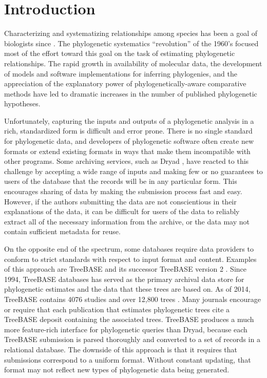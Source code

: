 \section{Introduction}

Characterizing and systematizing relationships among species has been a goal of biologists since \cite{Linne1758}.
The phylogenetic systematics ``revolution'' of the 1960's focused most of the effort toward this goal on the 
    task of estimating phylogenetic relationships.
The rapid growth in availability of molecular data, the development of models and software implementations for
    inferring phylogenies, and the appreciation of the explanatory power of phylogenetically-aware comparative methods
    \citep[e.g.][]{Felsenstein1985Comp} have led to dramatic increases
    in the number of published phylogenetic hypotheses.

Unfortunately, capturing the inputs and outputs of a phylogenetic analysis in a rich, standardized form is
 difficult and error prone. There is no single standard for phylogenetic data, and developers of phylogenetic software often create new formats or extend existing formats in ways that make them incompatible with other programs.
Some archiving services, such as Dryad \citep{Dryad}, have reacted to this challenge by accepting a 
    wide range of inputs and making few or no
    guarantees to users of the database that the records will be in any particular form.
This encourages sharing of data by making the submission process fast and easy. %
However, if the authors submitting the data are not conscientious in their explanations of the data, it can be difficult
    for users of the data to reliably extract all of the necessary information from the archive, or the data may not contain sufficient metadata for reuse.

On the opposite end of the spectrum, some databases require data providers to conform to strict
    standards with respect to input format and content.
Examples of this approach are TreeBASE \citep{SandersonDPE1994} and its successor TreeBASE version 2 \citep{TreeBase2}.
Since 1994, TreeBASE databases has served
    as the primary archival data store for phylogenetic estimates and the data that these trees are based on.
As of 2014, TreeBASE contains 4076 studies and over 12,800 trees \citep{TreeBaseWebCite}.
Many journals encourage or require that each publication that estimates phylogenetic trees cite a TreeBASE
    deposit containing the associated trees.
TreeBASE produces a much more feature-rich interface for phylogenetic queries than Dryad, because each 
    TreeBASE submission is parsed thoroughly and converted to a set of records in a relational database.
The downside of this approach is that it requires that submissions correspond to a uniform format.
Without constant updating,
    that format may not reflect new types of phylogenetic data being generated.

